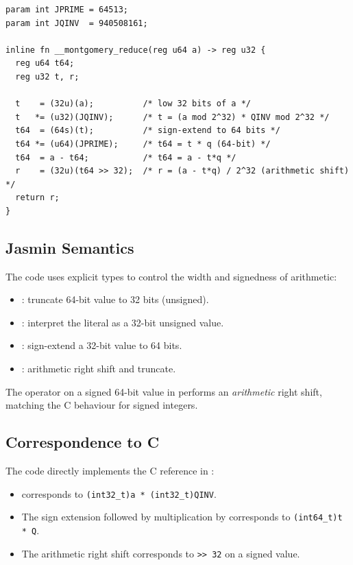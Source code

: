 \begin{lstlisting}[language=Jasmin,
  caption={Montgomery reduction in \texttt{reduce.jinc}},
  label={lst:mont_jasmin}]
param int JPRIME = 64513;
param int JQINV  = 940508161;

inline fn __montgomery_reduce(reg u64 a) -> reg u32 {
  reg u64 t64;
  reg u32 t, r;

  t    = (32u)(a);          /* low 32 bits of a */
  t   *= (u32)(JQINV);      /* t = (a mod 2^32) * QINV mod 2^32 */
  t64  = (64s)(t);          /* sign-extend to 64 bits */
  t64 *= (u64)(JPRIME);     /* t64 = t * q (64-bit) */
  t64  = a - t64;           /* t64 = a - t*q */
  r    = (32u)(t64 >> 32);  /* r = (a - t*q) / 2^32 (arithmetic shift) */
  return r;
}
\end{lstlisting}

\subsection{Jasmin Semantics}

The \jasmin{} code uses explicit types to control the width and signedness
of arithmetic:
\begin{itemize}
  \item {}: truncate 64-bit value to 32 bits (unsigned).
  \item {}: interpret the literal as a 32-bit unsigned value.
  \item {}: sign-extend a 32-bit value to 64 bits.
  \item {}: arithmetic right shift and truncate.
\end{itemize}

The \jasm{>>} operator on a signed 64-bit value in \jasmin{} performs an
\emph{arithmetic} right shift, matching the C behaviour for signed integers.

\subsection{Correspondence to C}

The \jasmin{} code directly implements the C reference in :
\begin{itemize}
  \item {} corresponds to
        \texttt{(int32\_t)a * (int32\_t)QINV}.
  \item The sign extension  followed by multiplication by
         corresponds to \texttt{(int64\_t)t * Q}.
  \item The arithmetic right shift  corresponds to
        \texttt{>> 32} on a signed value.
\end{itemize}

